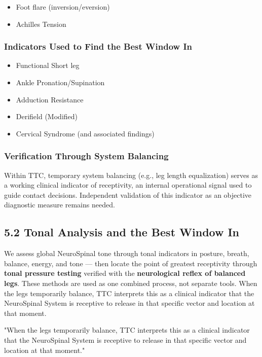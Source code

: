 \documentclass[11pt,letterpaper]{article}
\begin{document}
\begin{itemize}
\item Foot flare (inversion/eversion)
\item Achilles Tension
\end{itemize}


\subsubsection{Indicators Used to Find the Best Window In}

\begin{itemize}
\item Functional Short leg
\item Ankle Pronation/Supination
\item Adduction Resistance
\item Derifield (Modified)
\item Cervical Syndrome (and associated findings)
\end{itemize}


\subsubsection{Verification Through System Balancing}

Within TTC, temporary system balancing (e.g., leg length equalization) serves as a working clinical indicator of receptivity, an internal operational signal used to guide contact decisions. Independent validation of this indicator as an objective diagnostic measure remains needed.


\subsection{5.2 Tonal Analysis and the Best Window In}

We assess global NeuroSpinal tone through tonal indicators in posture, breath, balance, energy, and tone — then locate the point of greatest receptivity through \textbf{tonal pressure testing} verified with the \textbf{neurological reflex of balanced legs}. These methods are used as one combined process, not separate tools. When the legs temporarily balance, TTC interprets this as a clinical indicator that the NeuroSpinal System is receptive to release in that specific vector and location at that moment.


\begin{pullquotebox}
"When the legs temporarily balance, TTC interprets this as a clinical indicator that the NeuroSpinal System is receptive to release in that specific vector and location at that moment."
\end{pullquotebox}
\end{document}
